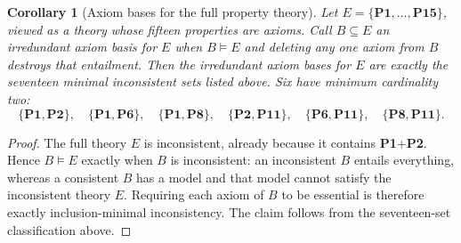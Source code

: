 \documentclass[11pt,a4paper,reqno]{amsart}
\newtheorem{corollary}[proposition]{Corollary}
\theoremstyle{definition}
\theoremstyle{remark}
\newcommand{\prop}[1]{\textbf{P#1}}
\begin{document}
\begin{corollary}[Axiom bases for the full property theory]\label{cor:axiom-bases}
Let $E=\{\prop{1},\ldots,\prop{15}\}$, viewed as a theory whose fifteen
properties are axioms.  Call $B\subseteq E$ an \emph{irredundant axiom basis}
for $E$ when $B\models E$ and deleting any one axiom from $B$ destroys that
entailment.  Then the irredundant axiom bases for $E$ are exactly the seventeen
minimal inconsistent sets listed above.  Six have minimum cardinality two:
\[
\{\prop{1},\prop{2}\},\quad
\{\prop{1},\prop{6}\},\quad
\{\prop{1},\prop{8}\},\quad
\{\prop{2},\prop{11}\},\quad
\{\prop{6},\prop{11}\},\quad
\{\prop{8},\prop{11}\}.
\]
\end{corollary}
\begin{proof}
The full theory $E$ is inconsistent, already because it contains
\prop{1}+\prop{2}.  Hence $B\models E$ exactly when $B$ is inconsistent: an
inconsistent $B$ entails everything, whereas a consistent $B$ has a model and
that model cannot satisfy the inconsistent theory $E$.  Requiring each axiom of
$B$ to be essential is therefore exactly inclusion-minimal inconsistency.  The
claim follows from the seventeen-set classification above.
\end{proof}
\end{document}
